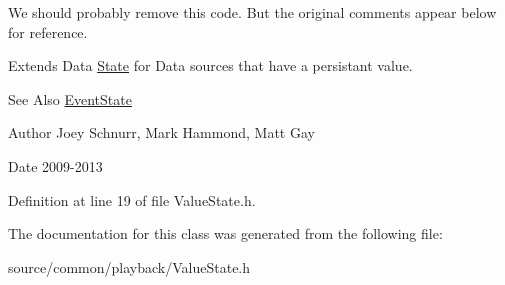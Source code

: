 We should probably remove this code. But the original comments appear below for reference.

Extends Data \hyperlink{class_picto_1_1_state}{State} for Data sources that have a persistant value. \begin{DoxySeeAlso}{See Also}
\hyperlink{class_picto_1_1_event_state}{Event\-State} 
\end{DoxySeeAlso}
\begin{DoxyAuthor}{Author}
Joey Schnurr, Mark Hammond, Matt Gay 
\end{DoxyAuthor}
\begin{DoxyDate}{Date}
2009-\/2013 
\end{DoxyDate}


Definition at line 19 of file Value\-State.\-h.



The documentation for this class was generated from the following file\-:\begin{DoxyCompactItemize}
\item 
source/common/playback/Value\-State.\-h\end{DoxyCompactItemize}
